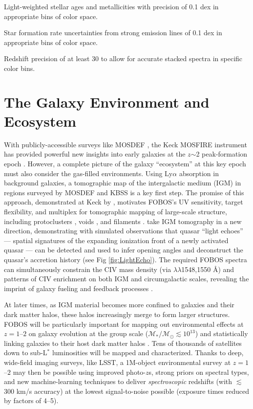 \documentclass[11pt,a4paper,twoside,onecolumn,openany,final,oldfontcommands]{memoir}
\begin{document}
\begin{sciencerequirement}

\reqitem Light-weighted stellar ages and metallicities with precision of 0.1 dex in appropriate bins of color space.

\reqitem Star formation rate uncertainties from strong emission lines of 0.1 dex in appropriate bins of color space.

\reqitem Redshift precision of at least 30 \kms{} to allow for accurate stacked spectra in specific color bins.

\end{sciencerequirement}


\section{The Galaxy Environment and Ecosystem}
\label{sci:ecosystem}

With publicly-accessible surveys like MOSDEF \citep{kriek15}, the Keck MOSFIRE instrument has provided powerful new insights into early galaxies at the $z$$\sim$2 peak-formation epoch \citep[also see KBSS,][]{steidel14}. However, a complete picture of the galaxy ``ecosystem'' at this key epoch must also consider the gas-filled environments. Using Ly$\alpha$ absorption in background galaxies, a tomographic map of the intergalactic medium (IGM) in regions surveyed by MOSDEF and KBSS is a key first step. The promise of this approach, demonstrated at Keck by \citet{lee14}, motivates FOBOS's UV sensitivity, target flexibility, and multiplex for tomographic mapping of large-scale structure, including protoclusters \citep{lee16,kartaltepe19}, voids \citep{krolewski18}, and filaments \citep{horowitz19}. \citet{2018arXiv181005156S} take IGM tomography in a new direction, demonstrating with simulated observations that quasar ``light echoes'' --- spatial signatures of the expanding ionization front of a newly activated quasar --- can be detected and used to infer opening angles and deconstruct the quasar's accretion history (see Fig \ref{fig:LightEcho}). The required FOBOS spectra can simultaneously constrain the CIV mass density (via $\lambda\lambda$1548,1550 \AA) and patterns of CIV enrichment on both IGM and circumgalactic scales, revealing the imprint of galaxy fueling and feedback processes \citep[e.g.,][]{tumlinson17}.

At later times, as IGM material becomes more confined to galaxies and their dark matter halos, these halos increasingly merge to form larger structures.  FOBOS will be particularly important for mapping out environmental effects at $z=1$--$2$ on galaxy evolution at the group scale ($\mathcal{M_\ast/M_\odot} \lesssim 10^{13}$) and statistically linking galaxies to their host dark matter halos \citep{behroozi19}.  Tens of thousands of satellites down to sub-L$^*$ luminosities will be mapped and characterized. Thanks to deep, wide-field imaging surveys, like LSST, a 1M-object environmental survey at $z=1$--$2$ may then be possible using improved photo-$z$s, strong priors on spectral types, and new machine-learning techniques to deliver \textit{ spectroscopic} redshifts (with $\lesssim$300 km/s accuracy) at the lowest signal-to-noise possible (exposure times reduced by factors of 4--5).
\end{document}
